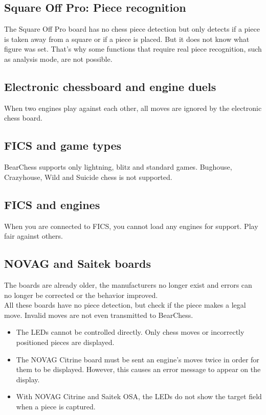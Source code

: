 \documentclass[11pt,a4paper]{article}
\begin{document}
\subsection{Square Off Pro: Piece recognition}
The Square Off Pro board has no chess piece detection but only detects if a piece is taken away from a square or if a piece is placed. But it does not know what figure was set. That's why some functions that require real piece recognition, such as analysis mode, are not possible.

\subsection{Electronic chessboard and engine duels}
When two engines play against each other, all moves are ignored by the electronic chess board.


\subsection{FICS and game types}
BearChess supports only lightning, blitz and standard games. Bughouse, Crazyhouse, Wild and Suicide chess is not supported.

\subsection{FICS and engines}
When you are connected to FICS, you cannot load any engines for support. Play fair against others.

\subsection{NOVAG and Saitek boards}
The boards are already older, the manufacturers no longer exist and errors can no longer be corrected or the behavior improved.\\
All these boards have no piece detection, but check if the piece makes a legal move. Invalid moves are not even transmitted to BearChess.
\begin{itemize}
	\item The LEDs cannot be controlled directly. Only chess moves or incorrectly positioned pieces are displayed.
	\item The NOVAG Citrine board must be sent an engine's moves twice in order for them to be displayed. However, this causes an error message to appear on the display.
	\item With NOVAG Citrine and Saitek OSA, the LEDs do not show the target field when a piece is captured.
\end{itemize}
\end{document}
